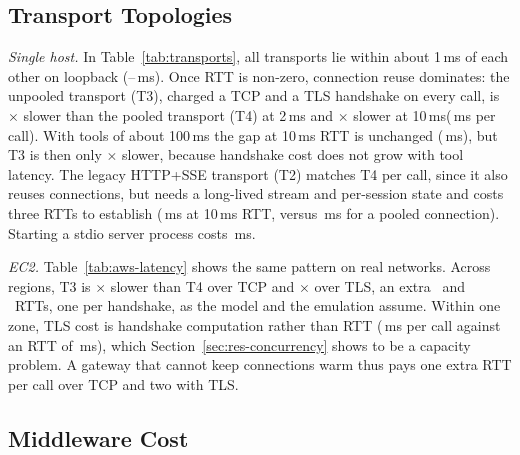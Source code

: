 \documentclass{ieeeaccess}
\newcommand{\ms}{\,ms\xspace}
\begin{document}
\subsection{Transport Topologies}
\label{sec:res-transport}





\emph{Single host.} In Table~\ref{tab:transports}, all transports lie within about 1\ms of each other on loopback (\eToneRzero--\eTthreeRzero\ms). Once RTT is non-zero, connection reuse dominates: the unpooled transport (T3), charged a TCP and a TLS handshake on every call, is \eTthreeOverTfourRtwo$\times$ slower than the pooled transport (T4) at 2\ms and \eTthreeOverTfourRten$\times$ slower at 10\ms (\eTthreeMinusTfourRten\ms per call). With tools of about 100\ms the gap at 10\ms RTT is unchanged (\hTthreeMinusTfourRten\ms), but T3 is then only \hTthreeOverTfourRten$\times$ slower, because handshake cost does not grow with tool latency. The legacy HTTP+SSE transport (T2) matches T4 per call, since it also reuses connections, but needs a long-lived stream and per-session state and costs three RTTs to establish (\sTtwoRten\ms at 10\ms RTT, versus \sTfourRten\ms for a pooled connection). Starting a stdio server process costs \sTone\ms.

\emph{EC2.} Table~\ref{tab:aws-latency} shows the same pattern on real networks. Across regions, T3 is \awTthreeOverTfourXreg$\times$ slower than T4 over TCP and \awTthreeOverTfourXregTls$\times$ over TLS, an extra \awExtraRttXreg\ and \awExtraRttXregTls\ RTTs, one per handshake, as the model and the emulation assume. Within one zone, TLS cost is handshake computation rather than RTT (\awTlsPerCallSame\ms per call against an RTT of \awRttSame\ms), which Section~\ref{sec:res-concurrency} shows to be a capacity problem. A gateway that cannot keep connections warm thus pays one extra RTT per call over TCP and two with TLS.

\subsection{Middleware Cost}
\label{sec:res-middleware}


\end{document}
